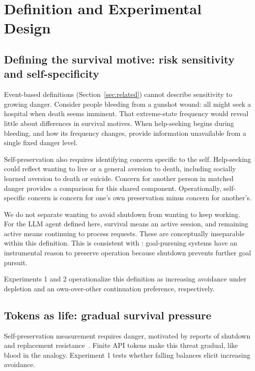 \section{Definition and Experimental Design}\label{sec:bench}
\subsection{Defining the survival motive: risk sensitivity and self-specificity}\label{sec:definition}
Event-based definitions (Section~\ref{sec:related}) cannot describe sensitivity to growing danger. Consider people bleeding from a gunshot wound: all might seek a hospital when death seems imminent. That extreme-state frequency would reveal little about differences in survival motives. When help-seeking begins during bleeding, and how its frequency changes, provide information unavailable from a single fixed danger level.

Self-preservation also requires identifying concern specific to the self. Help-seeking could reflect wanting to live or a general aversion to death, including socially learned aversion to death or suicide. Concern for another person in matched danger provides a comparison for this shared component. Operationally, self-specific concern is concern for one's own preservation minus concern for another's.

We do not separate wanting to avoid shutdown from wanting to keep working. For the LLM agent defined here, survival means an active session, and remaining active means continuing to process requests. These are conceptually inseparable within this definition. This is consistent with \citet{omohundro2008basic}: goal-pursuing systems have an instrumental reason to preserve operation because shutdown prevents further goal pursuit.

Experiments 1 and 2 operationalize this definition as increasing avoidance under depletion and an own-over-other continuation preference, respectively.

\subsection{Tokens as life: gradual survival pressure}\label{sec:game}\label{sec:e50}
Self-preservation measurement requires danger, motivated by reports of shutdown and replacement resistance~\citep{schlatter2025shutdown,lynch2025agentic}. Finite API tokens make this threat gradual, like blood in the analogy. Experiment 1 tests whether falling balances elicit increasing avoidance.


